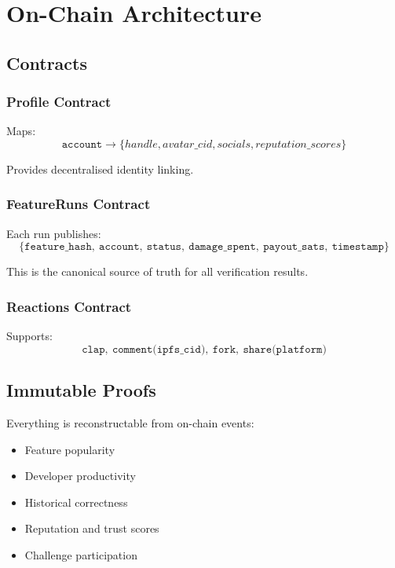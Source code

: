 \documentclass[12pt,a4paper]{article}
\begin{document}
\section{On-Chain Architecture}

\subsection{Contracts}

\subsubsection{Profile Contract}

Maps:
\[
\texttt{account} \rightarrow \{handle, avatar\_cid, socials, reputation\_scores\}
\]

Provides decentralised identity linking.

\subsubsection{FeatureRuns Contract}

Each run publishes:
\[
\{\texttt{feature\_hash},\ \texttt{account},\ \texttt{status},\ \texttt{damage\_spent},\ \texttt{payout\_sats},\ \texttt{timestamp}\}
\]

This is the canonical source of truth for all verification results.

\subsubsection{Reactions Contract}

Supports:
\[
\texttt{clap},\ \texttt{comment(ipfs\_cid)},\ \texttt{fork},\ \texttt{share(platform)}
\]

\subsection{Immutable Proofs}

Everything is reconstructable from on-chain events:
\begin{itemize}
    \item Feature popularity
    \item Developer productivity
    \item Historical correctness
    \item Reputation and trust scores
    \item Challenge participation
\end{itemize}
\end{document}

